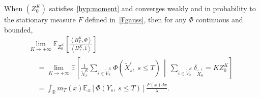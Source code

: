 \documentclass[10pt]{amsart}
\theoremstyle{definition}\newtheorem{defi}[theo]{Definition}\newtheorem{rema}[theo]{Remark}\newtheorem{exam}[theo]{Example}\newtheorem{exem}[theo]{Example}\newtheorem{nota}[theo]{Notation}
\newcommand*\R{\mathbb{R}}
\newcommand*\E{\mathbb{E}}
\begin{document}
\begin{prop}\label{prop:hist}
When $(Z^K_0)$ satisfies~\eqref{hyp:moment} and converges weakly and in probability to the stationary measure $F$ defined in~\eqref{Fgauss}, then for any $\Phi$ continuous and bounded,
\begin{multline}\label{eq:hist}
\lim_{K \rightarrow +\infty} \E_{Z^K_0}\left[\frac{\left\langle H^K_T,\Phi\right\rangle}{\left\langle H^K_T,1\right\rangle}\right]\\
\begin{aligned}
&=\lim_{K \to +\infty} \E\left[\frac{1}{\widetilde{N}^K_{T}}\sum_{i \in \widetilde{V}^K_{T}}\Phi\left(\widetilde X^i_{s},\ s\leq T\right) \, \middle|\ \sum_{i \in \widetilde V^K_{0}} \delta_{\widetilde{X}^i_{0}}= K Z^K_0\right]\\
&= \int_{\R} m_{T}(x) \E_{x}\left[\Phi\left(Y_{s},\ s\leq T\right)\right] \frac{F(x)dx}{\lambda}.
\end{aligned}
\end{multline}
\end{prop}
\end{document}
